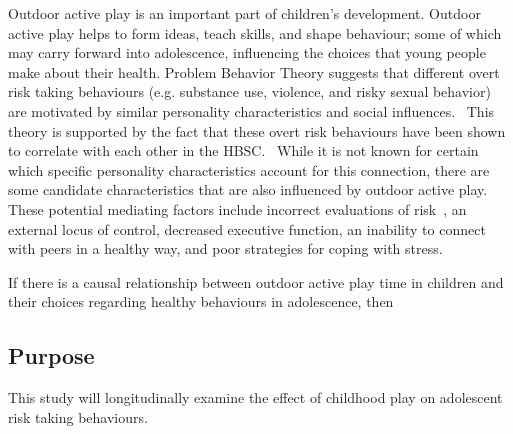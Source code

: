 \documentclass [11pt]{article}
\begin{document}
Outdoor active play is an important part of children's development. Outdoor active play helps to form ideas, teach skills, and shape behaviour; some of which may carry forward into adolescence, influencing the choices that young people make about their health. Problem Behavior Theory \cite{Jessor1987-wz} suggests that different overt risk taking behaviours (e.g. substance use, violence, and risky sexual behavior) are motivated by similar personality characteristics and social influences.~\cite{Mobley2013-ij} This theory is supported by the fact that these overt risk behaviours have been shown to correlate with each other in the HBSC.~\cite{Kwong2017-oe} While it is not known for certain which specific personality characteristics account for this connection, there are some candidate characteristics that are also influenced by outdoor active play. These potential mediating factors include incorrect evaluations of risk~\cite{Couch2017-tb}, an external locus of control, decreased executive function, an inability to connect with peers in a healthy way, and poor strategies for coping with stress.~\cite{Unger2016-qm,Johnson2002-qf,barker2014less}

If there is a causal relationship between outdoor active play time in children and their choices regarding healthy behaviours in adolescence, then 

\subsection{Purpose}

This study will longitudinally examine the effect of childhood play on adolescent risk taking behaviours. 
\end{document}
